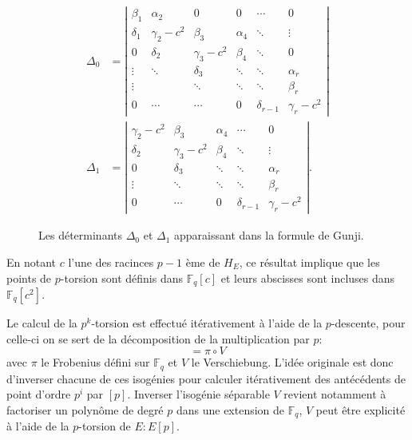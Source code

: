 \documentclass[10pt,a4paper]{book}
\theoremstyle{plain}
\theoremstyle{definition}
\theoremstyle{definition}
\theoremstyle{definition}
\theoremstyle{definition}
\theoremstyle{remark}
\theoremstyle{remark}
\theoremstyle{definition}
\begin{document}
\begin{figure}
\label{fig:gun:det}
\begin{equation*}
\begin{alignedat}{1}
\Delta_0 &=\left| 
\begin{matrix}
\beta_1 & \alpha_2 & 0 & 0 & \cdots & 0\\
\delta_1 & \gamma_2 - c^2 & \beta_3 & \alpha_4 & \ddots & \vdots \\
0 & \delta_2 & \gamma_3 - c^2 & \beta_4 & \ddots & 0 \\
\vdots & \ddots & \delta_3 & \ddots & \ddots & \alpha_r \\
\vdots & & \ddots  & \ddots & \ddots & \beta_r \\
0 & \cdots & \cdots & 0 & \delta_{r-1} & \gamma_r - c^2 
\end{matrix}
\right| \\
\Delta_1 &= \left| 
\begin{matrix}
\gamma_2-c^2 & \beta_3 & \alpha_4 & \cdots & 0 \\
\delta_2 & \gamma_3 - c^2 & \beta_4 & \ddots & \vdots \\
0 & \delta_3 & \ddots & \ddots & \alpha_r \\
\vdots & \ddots & \ddots & \ddots & \beta_r \\
0 & \cdots & 0 & \delta_{r-1} & \gamma_r-c^2
\end{matrix}
\right|.
\end{alignedat}
\end{equation*}
\caption{Les déterminants $\Delta_0$ et $\Delta_1$ apparaissant dans la formule de Gunji.}
\end{figure}

En notant $c$ l'une des racinces $p-1$ ème de $H_E$, ce résultat implique que les points de $p$-torsion sont définis dans $\mathbb{F}_q[c]$ et leurs abscisses sont incluses dans $\mathbb{F}_q[c^2]$.


Le calcul de la $p^k$-torsion est effectué itérativement à l'aide de la $p$-descente, pour celle-ci on se sert de la décomposition de la multiplication par $p$: 
\begin{equation}
[p]=\pi \circ V
\end{equation}
avec $\pi$ le Frobenius défini sur $\mathbb{F}_q$ et $V$ le Verschiebung. L'idée originale est donc d'inverser chacune  de ces isogénies pour calculer itérativement des antécédents de point d'ordre $p^i$ par $[p]$. Inverser l'isogénie séparable $V$ revient notamment à factoriser un polynôme de degré $p$ dans une extension de $\mathbb{F}_q$, $V$ peut être explicité à l'aide de la $p$-torsion de $E: E[p]$. 
\end{document}
